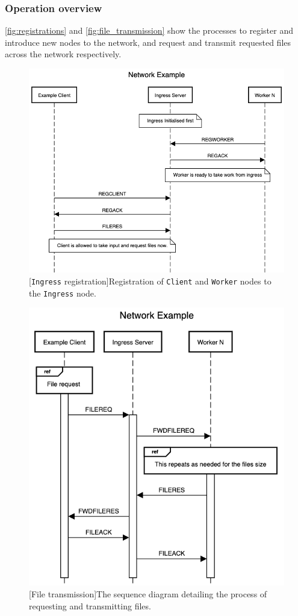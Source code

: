 \documentclass{article}
\newcommand{\code}[1]{\texttt{#1}}
\begin{document}
\subsubsection[Operation]{Operation overview}
\autoref{fig:registrations} and \autoref{fig:file_transmission} show the processes to register and introduce new nodes to the network, and request and transmit requested files across the network respectively.
\begin{figure}[!ht]
	\centering
	\begin{minipage}{.5\textwidth}
		\centering
		\includegraphics[width=0.8\linewidth]{client-worker-reg.png}
		\captionsetup{width=.6\linewidth}
		[\code{Ingress} registration]{Registration of \code{Client} and \code{Worker} nodes to the \code{Ingress} node.}
		\label{fig:registrations}
	\end{minipage}%
	\begin{minipage}{.5\textwidth}
		\centering
		\includegraphics[width=0.8\linewidth]{file_req.png}
		\captionsetup{width=.6\linewidth}
		[File transmission]{The sequence diagram detailing the process of requesting and transmitting files.}
		\label{fig:file_transmission}
	\end{minipage}
\end{figure}
\end{document}
